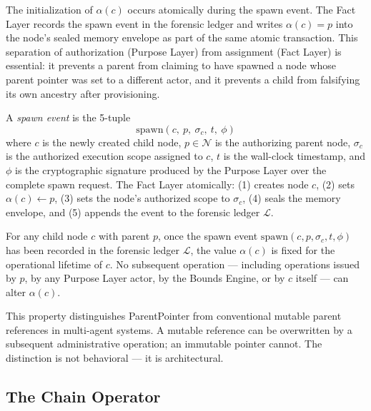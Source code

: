 The initialization of $\alpha(c)$ occurs atomically during the spawn event. The Fact Layer records the spawn event in the forensic ledger and writes $\alpha(c) = p$ into the node's sealed memory envelope as part of the same atomic transaction. This separation of authorization (Purpose Layer) from assignment (Fact Layer) is essential: it prevents a parent from claiming to have spawned a node whose parent pointer was set to a different actor, and it prevents a child from falsifying its own ancestry after provisioning.

\begin{dfn}\label{dfn:spawn-event}
A \emph{spawn event} is the 5-tuple
\begin{equation}
\mathrm{spawn}(c,\ p,\ \sigma_c,\ t,\ \phi)
\label{eq:spawn-event}
\end{equation}
where $c$ is the newly created child node, $p \in \mathcal{N}$ is the authorizing parent node, $\sigma_c$ is the authorized execution scope assigned to $c$, $t$ is the wall-clock timestamp, and $\phi$ is the cryptographic signature produced by the Purpose Layer over the complete spawn request. The Fact Layer atomically: (1) creates node $c$, (2) sets $\alpha(c) \leftarrow p$, (3) sets the node's authorized scope to $\sigma_c$, (4) seals the memory envelope, and (5) appends the event to the forensic ledger $\mathcal{L}$.
\end{dfn}

\begin{prop}\label{prop:parent-pointer-immutable}
For any child node $c$ with parent $p$, once the spawn event $\mathrm{spawn}(c, p, \sigma_c, t, \phi)$ has been recorded in the forensic ledger $\mathcal{L}$, the value $\alpha(c)$ is fixed for the operational lifetime of $c$. No subsequent operation — including operations issued by $p$, by any Purpose Layer actor, by the Bounds Engine, or by $c$ itself — can alter $\alpha(c)$.
\end{prop}

This property distinguishes ParentPointer from conventional mutable parent references in multi-agent systems. A mutable reference can be overwritten by a subsequent administrative operation; an immutable pointer cannot. The distinction is not behavioral — it is architectural.

\subsection{The Chain Operator}
\label{sec:chain-operator}

